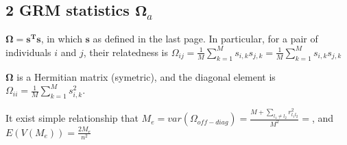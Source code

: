 \documentclass[]{article}
\newenvironment{Shaded}{\begin{snugshade}}{\end{snugshade}}
\newcommand{\ControlFlowTok}[1]{\textcolor[rgb]{0.13,0.29,0.53}{\textbf{#1}}}
\newcommand{\DataTypeTok}[1]{\textcolor[rgb]{0.13,0.29,0.53}{#1}}
\newcommand{\DecValTok}[1]{\textcolor[rgb]{0.00,0.00,0.81}{#1}}
\newcommand{\FloatTok}[1]{\textcolor[rgb]{0.00,0.00,0.81}{#1}}
\newcommand{\KeywordTok}[1]{\textcolor[rgb]{0.13,0.29,0.53}{\textbf{#1}}}
\newcommand{\NormalTok}[1]{#1}
\newcommand{\OperatorTok}[1]{\textcolor[rgb]{0.81,0.36,0.00}{\textbf{#1}}}
\newcommand{\StringTok}[1]{\textcolor[rgb]{0.31,0.60,0.02}{#1}}
\begin{document}
\hypertarget{grm-statistics-mathbfomega_a}{%
\subsection{\texorpdfstring{2 GRM statistics
\(\mathbf{\Omega}_a\)}{2 GRM statistics \textbackslash{}mathbf\{\textbackslash{}Omega\}\_a}}\label{grm-statistics-mathbfomega_a}}

\(\mathbf{\Omega}=\mathbf{s^Ts}\), in which \(\mathbf{s}\) as defined in
the last page. In particular, for a pair of individuals \(i\) and \(j\),
their relatedness is
\(\Omega_{ij}=\frac{1}{M}\sum_{k=1}^Ms_{i,k}s_{j,k}=\frac{1}{M}\sum_{k=1}^Ms_{i,k}s_{j,k}\)

\(\mathbf{\Omega}\) is a Hermitian matrix (symetric), and the diagonal
element is \(\Omega_{ii}=\frac{1}{M}\sum_{k=1}^Ms_{i,k}^2\).

It exist simple relationship that
\(M_e=var(\Omega_{off-diag})=\frac{M+\sum_{l_1 \ne l_2}r_{l_1l_2}^2}{M^2}=\),
and \(E(V(M_e))=\frac{2M_e}{n^2}\)

\begin{Shaded}
\end{Shaded}
\end{document}
